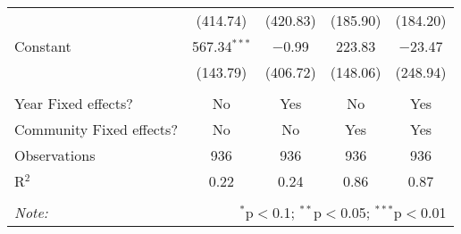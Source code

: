 \begin{table}[!htbp]
\begin{tabular}{@{\extracolsep{5pt}}lcccc}
  & (414.74) & (420.83) & (185.90) & (184.20) \\ 
  Constant & 567.34$^{***}$ & $-$0.99 & 223.83 & $-$23.47 \\ 
  & (143.79) & (406.72) & (148.06) & (248.94) \\ 
 \hline \\[-1.8ex] 
Year Fixed effects? & No & Yes & No & Yes \\ 
Community Fixed effects? & No & No & Yes & Yes \\ 
Observations & 936 & 936 & 936 & 936 \\ 
R$^{2}$ & 0.22 & 0.24 & 0.86 & 0.87 \\ 
\hline 
\hline \\[-1.8ex] 
\textit{Note:}  & \multicolumn{4}{r}{$^{*}$p$<$0.1; $^{**}$p$<$0.05; $^{***}$p$<$0.01} \\ 
\end{tabular} 
\end{table} 
